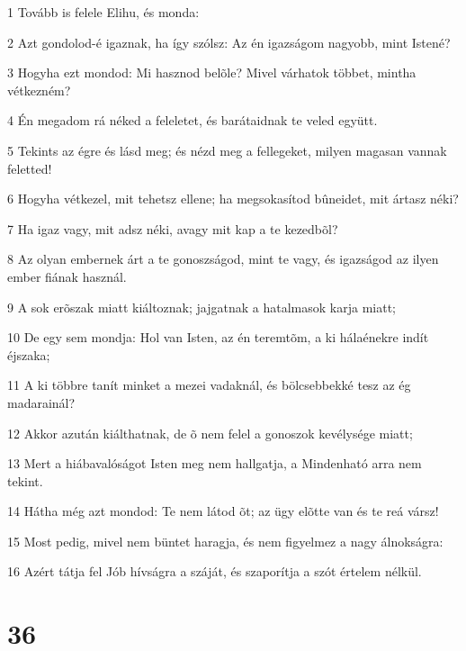 \par 1 Tovább is felele Elihu, és monda:
\par 2 Azt gondolod-é igaznak, ha így szólsz: Az én igazságom nagyobb, mint Istené?
\par 3 Hogyha ezt mondod: Mi hasznod belõle? Mivel várhatok többet, mintha vétkezném?
\par 4 Én megadom rá néked a feleletet, és barátaidnak te veled együtt.
\par 5 Tekints az égre és lásd meg; és nézd meg a fellegeket, milyen magasan vannak feletted!
\par 6 Hogyha vétkezel, mit tehetsz ellene; ha megsokasítod bûneidet, mit ártasz néki?
\par 7 Ha igaz vagy, mit adsz néki, avagy mit kap a te kezedbõl?
\par 8 Az olyan embernek árt a te gonoszságod, mint te vagy, és igazságod az ilyen ember fiának használ.
\par 9 A sok erõszak miatt kiáltoznak; jajgatnak a hatalmasok karja miatt;
\par 10 De egy sem mondja: Hol van Isten, az én teremtõm, a ki hálaénekre indít éjszaka;
\par 11 A ki többre tanít minket a mezei vadaknál, és bölcsebbekké tesz az ég madarainál?
\par 12 Akkor azután kiálthatnak, de õ nem felel a gonoszok kevélysége miatt;
\par 13 Mert a hiábavalóságot Isten meg nem hallgatja, a Mindenható arra nem tekint.
\par 14 Hátha még azt mondod: Te nem látod õt; az ügy elõtte van és te reá vársz!
\par 15 Most pedig, mivel nem büntet haragja, és nem figyelmez a nagy álnokságra:
\par 16 Azért tátja fel Jób hívságra a száját, és szaporítja a szót értelem nélkül.

\chapter{36}

